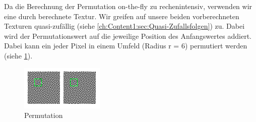Da die Berechnung der Permutation \glqq on-the-fly\grqq{} zu rechenintensiv, verwenden wir eine durch 
 berechnete Textur.
Wir greifen auf unsere beiden vorberechneten Texturen quasi-zufällig (siehe \ref{ch:Content1:sec:Quasi-Zufallsfolgen})
zu. Dabei wird der Permutationswert auf die jeweilige Position des Anfangswertes addiert.
Dabei kann ein jeder Pixel in einem Umfeld (Radius r = 6) permutiert werden (siehe \ref{pic:Permutation}).

\begin{figure}[H]
    \centering
    \includegraphics[width=0.5\linewidth]{content/simulatedAnnealing/Bilder/Permutation.png}
    \caption{Permutation}
    \label{pic:Permutation}
\end{figure}

\newpage

